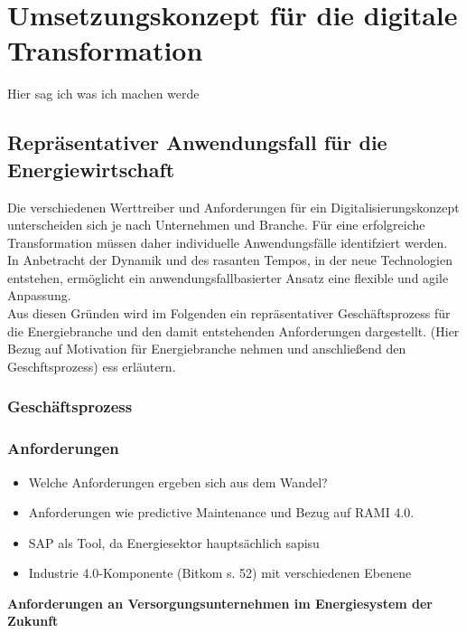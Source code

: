 \section{Umsetzungskonzept für die digitale Transformation}



 Hier sag ich was ich machen werde

\subsection{Repräsentativer Anwendungsfall für die Energiewirtschaft}\label{usecase}

Die verschiedenen Werttreiber und Anforderungen für ein Digitalisierungskonzept unterscheiden sich je nach Unternehmen und Branche.
Für eine erfolgreiche Transformation müssen daher individuelle Anwendungsfälle identifziert werden.
In Anbetracht der Dynamik und des rasanten Tempos, in der neue Technologien entstehen,
ermöglicht ein anwendungsfallbasierter Ansatz eine flexible und agile Anpassung. \citep[S. 31]{Acharya2019}
\\Aus diesen Gründen wird im Folgenden ein repräsentativer Geschäftsprozess für die Energiebranche
und den damit entstehenden Anforderungen dargestellt.
\newline (Hier Bezug auf Motivation für Energiebranche nehmen und anschließend den Geschftsprozess)
ess erläutern.

\subsubsection{Geschäftsprozess}

\subsubsection{Anforderungen}
\begin{itemize}
  \item Welche Anforderungen ergeben sich aus dem Wandel?
  \item Anforderungen wie predictive Maintenance und Bezug auf RAMI 4.0.
  \item SAP als Tool, da Energiesektor hauptsächlich \acf{sapisu}
  \item Industrie 4.0-Komponente (Bitkom s. 52) mit verschiedenen Ebenene
\end{itemize}

\textbf{Anforderungen an Versorgungsunternehmen im Energiesystem der Zukunft \citep[S. 19]{Doleski2016}}

